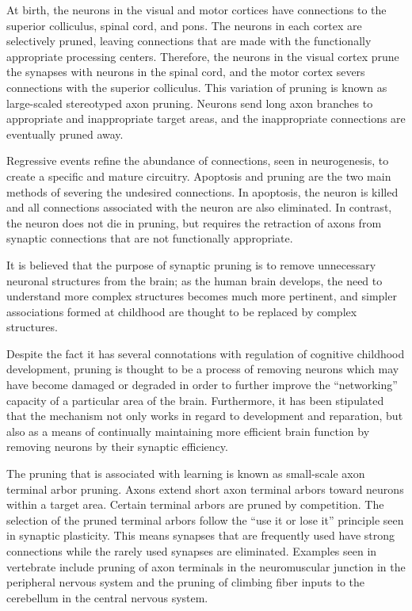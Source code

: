 At birth, the neurons in the visual and motor cortices have connections to the superior colliculus, spinal cord, and pons. The neurons in each cortex are selectively pruned, leaving connections that are made with the functionally appropriate processing centers. Therefore, the neurons in the visual cortex prune the synapses with neurons in the spinal cord, and the motor cortex severs connections with the superior colliculus. This variation of pruning is known as large-scaled stereotyped axon pruning. Neurons send long axon branches to appropriate and inappropriate target areas, and the inappropriate connections are eventually pruned away.

Regressive events refine the abundance of connections, seen in neurogenesis, to create a specific and mature circuitry. Apoptosis and pruning are the two main methods of severing the undesired connections. In apoptosis, the neuron is killed and all connections associated with the neuron are also eliminated. In contrast, the neuron does not die in pruning, but requires the retraction of axons from synaptic connections that are not functionally appropriate.

It is believed that the purpose of synaptic pruning is to remove unnecessary neuronal structures from the brain; as the human brain develops, the need to understand more complex structures becomes much more pertinent, and simpler associations formed at childhood are thought to be replaced by complex structures.

Despite the fact it has several connotations with regulation of cognitive childhood development, pruning is thought to be a process of removing neurons which may have become damaged or degraded in order to further improve the ``networking'' capacity of a particular area of the brain. Furthermore, it has been stipulated that the mechanism not only works in regard to development and reparation, but also as a means of continually maintaining more efficient brain function by removing neurons by their synaptic efficiency.

The pruning that is associated with learning is known as small-scale axon terminal arbor pruning. Axons extend short axon terminal arbors toward neurons within a target area. Certain terminal arbors are pruned by competition. The selection of the pruned terminal arbors follow the ``use it or lose it'' principle seen in synaptic plasticity. This means synapses that are frequently used have strong connections while the rarely used synapses are eliminated. Examples seen in vertebrate include pruning of axon terminals in the neuromuscular junction in the peripheral nervous system and the pruning of climbing fiber inputs to the cerebellum in the central nervous system.

